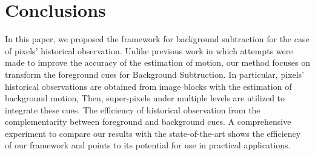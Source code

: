 \documentclass[journal]{IEEEtran}
\begin{document}
\section{Conclusions}
In this paper,
we proposed the framework for background subtraction for the case of pixels' historical observation.
Unlike previous work in which attempts were made to improve the accuracy of the estimation of motion,
our method focuses on transform the foreground cues for Background Subtruction.
In particular, 
pixels' historical observations are obtained from image blocks with the estimation of background motion,
Then, super-pixels under multiple levels are utilized to integrate these cues.
The efficiency of historical observation from the complementarity between foreground and background cues.
A comprehensive experiment to compare our results with the state-of-the-art shows the efficiency of our framework and points to its potential for use in practical applications.

\ifCLASSOPTIONcaptionsoff
  \newpage
\fi

  
  
\end{document}
